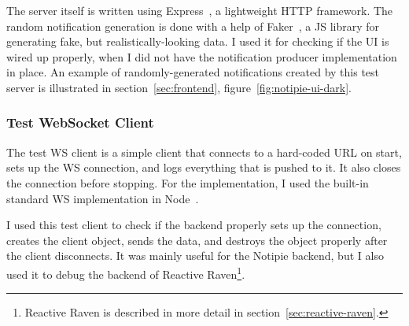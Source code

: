 The server itself is written
using Express~\cite{holowaychuck_express_2022},
a lightweight \ac{HTTP} framework.
The random notification generation
is done with a help of Faker~\cite{marak_faker_2022},
a \ac{JS} library for generating fake,
but realistically-looking data.
I used it for checking if the \ac{UI}
is wired up properly,
when I did not have
the notification producer
implementation in place.
An example of randomly-generated notifications
created by this test server is illustrated
in section~\ref{sec:frontend},
figure~\ref{fig:notipie-ui-dark}.

\subsubsection{Test WebSocket Client}\label{sec:test-ws-client}

The test \ac{WS} client
is a simple client that connects
to a hard-coded \ac{URL} on start,
sets up the \ac{WS} connection,
and logs everything that is pushed to it.
It also closes the connection before stopping.
For the implementation,
I used the built-in standard \ac{WS} implementation
in Node~\cite{trott_node_2022}.

I used this test client
to check if the backend properly
sets up the connection,
creates the client object,
sends the data,
and destroys the object properly
after the client disconnects.
It was mainly useful for the Notipie backend,
but I also used it to debug the backend
of Reactive Raven\footnote{
  Reactive Raven is described in more detail in section~\ref{sec:reactive-raven}.
}.
